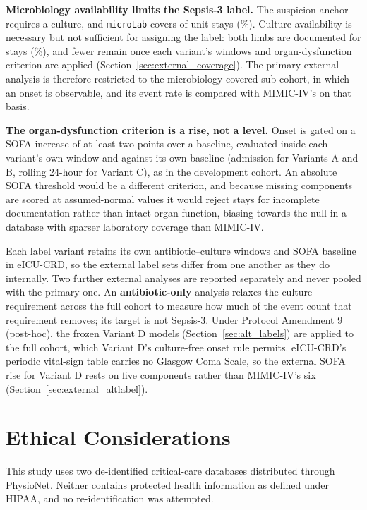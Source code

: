 \textbf{Microbiology availability limits the Sepsis-3 label.} The suspicion
anchor requires a culture, and \texttt{microLab} covers \pcExtNMicroStays{} of
\pcExtNCohortStays{} unit stays (\pcExtMicroCoverage\%). Culture availability
is necessary but not sufficient for assigning the label: both limbs are
documented for \pcExtNBothLimbStays{} stays (\pcExtBothLimbCoverage\%), and
fewer remain once each variant's windows and organ-dysfunction criterion are
applied (Section~\ref{sec:external_coverage}). The primary external analysis
is therefore restricted to the microbiology-covered sub-cohort, in which an
onset is observable, and its event rate is compared with MIMIC-IV's on that
basis.

\textbf{The organ-dysfunction criterion is a rise, not a level.} Onset is
gated on a SOFA increase of at least two points over a baseline, evaluated
inside each variant's own window and against its own baseline (admission for
Variants A and B, rolling 24-hour for Variant C), as in the development
cohort. An absolute SOFA threshold would be a different criterion, and because
missing components are scored at assumed-normal values it would reject stays
for incomplete documentation rather than intact organ function, biasing
towards the null in a database with sparser laboratory coverage than
MIMIC-IV.

Each label variant retains its own antibiotic--culture windows and SOFA
baseline in eICU-CRD, so the external label sets differ from one another as
they do internally. Two further external analyses are reported separately and
never pooled with the primary one. An \textbf{antibiotic-only} analysis relaxes
the culture requirement across the full cohort to measure how much of the
event count that requirement removes; its target is not Sepsis-3. Under
Protocol Amendment 9 (post-hoc), the frozen Variant D models
(Section~\ref{sec:alt_labels}) are applied to the full cohort, which Variant
D's culture-free onset rule permits. eICU-CRD's periodic vital-sign table
carries no Glasgow Coma Scale, so the external SOFA rise for Variant D rests on
five components rather than MIMIC-IV's six (Section~\ref{sec:external_altlabel}).


\section{Ethical Considerations}
\label{sec:ethics}

This study uses two de-identified critical-care databases distributed through
PhysioNet. Neither contains protected health information as defined under
HIPAA, and no re-identification was attempted.

